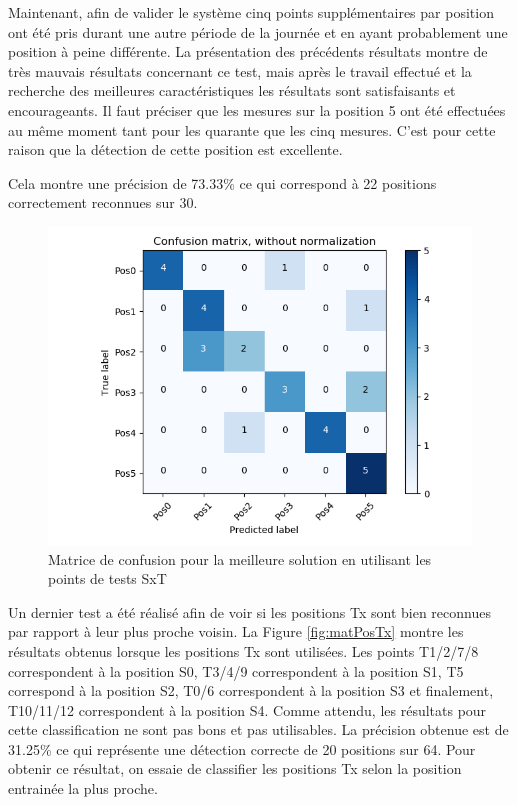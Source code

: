 Maintenant, afin de valider le système cinq points supplémentaires par position ont été pris durant une autre période de la journée et en ayant probablement une position à peine différente. La présentation des précédents résultats montre de très mauvais résultats concernant ce test, mais après le travail effectué et la recherche des meilleures caractéristiques les résultats sont satisfaisants et encourageants. Il faut préciser que les mesures sur la position 5 ont été effectuées au même moment tant pour les quarante que les cinq mesures. C'est pour cette raison que la détection de cette position est excellente. 

Cela montre une précision de 73.33\% ce qui correspond à 22 positions correctement reconnues sur 30. 
\begin{figure}[htp]
 \begin{center}
  \includegraphics[scale=0.5]{figures/mat_pos_SxT.png}
  \caption{Matrice de confusion pour la meilleure solution en utilisant les points de tests SxT}
  \label{fig:matPosSxT} %
 \end{center}
\end{figure}

Un dernier test a été réalisé afin de voir si les positions Tx sont bien reconnues par rapport à leur plus proche voisin. La Figure \ref{fig:matPosTx} montre les résultats obtenus lorsque les positions Tx sont utilisées. Les points T1/2/7/8 correspondent à la position S0, T3/4/9 correspondent à la position S1, T5 correspond à la position S2, T0/6 correspondent à la position S3 et finalement, T10/11/12 correspondent à la position S4. Comme attendu, les résultats pour cette classification ne sont pas bons et pas utilisables. La précision obtenue est de 31.25\% ce qui représente une détection correcte de 20 positions sur 64. Pour obtenir ce résultat, on essaie de classifier les positions Tx selon la position entrainée la plus proche. 

